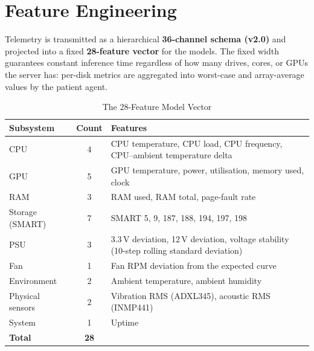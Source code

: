 \documentclass[12pt,a4paper]{report}
\begin{document}
\section{Feature Engineering}

Telemetry is transmitted as a hierarchical \textbf{36-channel schema (v2.0)} and projected into a fixed \textbf{28-feature vector} for the models. The fixed width guarantees constant inference time regardless of how many drives, cores, or GPUs the server has: per-disk metrics are aggregated into worst-case and array-average values by the patient agent.

\begin{table}[h!]
  \centering
  \caption{The 28-Feature Model Vector}
  \label{tab:features}
  \vspace*{5pt}
  \footnotesize
  \renewcommand{\arraystretch}{1.4}
  \begin{tabular}{|p{2.4cm}|c|p{9.4cm}|}
    \hline
    \textbf{Subsystem} & \textbf{Count} & \textbf{Features} \\ \hline
    CPU & 4 & CPU temperature, CPU load, CPU frequency, CPU--ambient temperature delta \\ \hline
    GPU & 5 & GPU temperature, power, utilisation, memory used, clock \\ \hline
    RAM & 3 & RAM used, RAM total, page-fault rate \\ \hline
    Storage (SMART) & 7 & SMART 5, 9, 187, 188, 194, 197, 198 \\ \hline
    PSU & 3 & 3.3\,V deviation, 12\,V deviation, voltage stability (10-step rolling standard deviation) \\ \hline
    Fan & 1 & Fan RPM deviation from the expected curve \\ \hline
    Environment & 2 & Ambient temperature, ambient humidity \\ \hline
    Physical sensors & 2 & Vibration RMS (ADXL345), acoustic RMS (INMP441) \\ \hline
    System & 1 & Uptime \\ \hline
    \textbf{Total} & \textbf{28} & \\ \hline
  \end{tabular}
\end{table}
\end{document}

